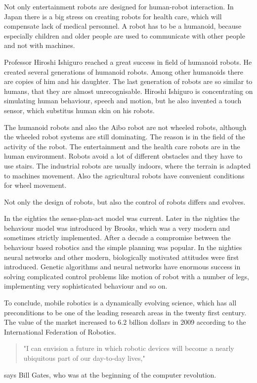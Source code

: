 \documentclass[12pt,notitlepage]{report}
\begin{document}
	Not only entertainment robots are designed for human-robot interaction. In Japan there is a big stress 
	on creating	robots for health care, which will compensate lack of medical personnel. 
	A robot has to be a humanoid, because especially children and older people are used to 
	communicate with other people and not with machines.
	
	Professor Hiroshi Ishiguro reached a great success in field of humanoid robots. 
	He created several generations of humanoid robots.
        Among other humanoids there are copies of him and his daughter.
	The last generation of robots are so similar to humans, that they are almost unrecognisable.
	Hiroshi Ishiguro is concentrating on simulating human behaviour, speech and motion, 
	but he also invented a touch sensor, which substitus human skin on his robots.
	
	The humanoid robots and also the Aibo robot are not  wheeled robots, although the wheeled 
	robot systems are still	dominating. The reason is in the field of the activity of the robot. 
	The entertainment and the health care robots are in the human environment. 
	Robots avoid a lot of different obstacles and they have to use stairs.
	The industrial robots are usually indoors, where the terrain is adapted to machines movement. 
	Also the agricultural robots have convenient conditions for wheel movement.
	
	Not only the design of robots, but also the control of robots differs and evolves.
	
	In the eighties the sense-plan-act model was current.
	Later in the nighties the behaviour model was introduced by Brooks,
	which was a very modern and sometimes strictly implemented.	
	After a decade a compromise between the behaviour based robotics and the simple planning was popular.
	In the nighties neural networks and other modern, biologically motivated attitudes were first introduced.
	Genetic algorithms and neural networks have enormous success in solving complicated control problems like motion of
	robot with a number of legs, implementing very sophisticated behaviour and so on.
	
	To conclude, mobile robotics is a dynamically evolving science,
	which has all preconditions to be one of the leading research areas in the twenty first century.
	The value of the market increased to 6.2 billion dollars in 2009 according to the International Federation of Robotics.
	\cite{worldrob}
	\begin{quote}	 	
	"I can envision a future in which robotic devices will become a nearly ubiquitous part of our day-to-day lives," 
	\end{quote}
	says Bill Gates, who was at the beginning of the computer revolution. %
	
\end{document}
